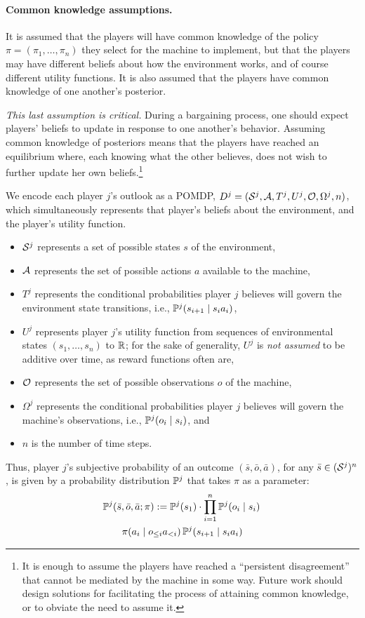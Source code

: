\documentclass{article}
\newcommand{\seq}{\bar}
\newcommand{\hist}[1]{o_{\le #1}a_{<#1}}
\begin{document}
\paragraph{Common knowledge assumptions.}  It is assumed that the players will have common knowledge of the policy $\pi = (\pi_1,\ldots,\pi_n)$ they select for the machine to implement, but that the players may have different beliefs about how the environment works, and of course different utility functions.  It is also assumed that the players have common knowledge of one another's posterior.  

\emph{This last assumption is critical.}  During a bargaining process, one should expect players' beliefs to update in response to one another's behavior.   Assuming common knowledge of posteriors means that the players have reached an equilibrium where, each knowing what the other believes, does not wish to further update her own beliefs.\footnote{It is enough to assume the players have reached a ``persistent disagreement'' that cannot be mediated by the machine in some way.  Future work should design solutions for facilitating the process of attaining common knowledge, or to obviate the need to assume it.}

We encode each player $j$'s outlook as a POMDP, $D^j = (\mathcal{S}^j,\mathcal{A},T^j, U^j, \mathcal{O}, \Omega^j, n)$, which simultaneously represents that player's beliefs about the environment, and the player's utility function.
\begin{itemize}
\item $\mathcal{S}^j$ represents a set of possible states $s$ of the environment,
\item $\mathcal{A}$ represents the set of possible actions $a$ available to the machine,
\item $T^j$ represents the conditional probabilities player $j$ believes will govern the environment state transitions, i.e., $\mathbb{P}^j(s_{i+1}\mid s_i a_i)$,
\item $U^j$ represents player $j$'s utility function from sequences of environmental states $(s_1,\ldots,s_n)$ to $\mathbb{R}$; for the sake of generality, $U^j$ is \emph{not assumed} to be additive over time, as reward functions often are, 
\item $\mathcal{O}$ represents the set of possible observations $o$ of the machine, 
\item $\Omega^j$ represents the conditional probabilities player $j$ believes will govern the machine's observations, i.e., $\mathbb{P}^j(o_i\mid s_i)$, and
\item $n$ is the number of time steps.
\end{itemize}
%
Thus, player $j$'s subjective probability of an outcome $(\seq s, \seq o, \seq a)$, for any $\seq s \in (\Ss^j)^n$, is given by a probability distribution $\mathbb{P}^j$ that takes $\pi$ as a parameter:
\begin{multline}
\label{eqn:pomdp}
\PP^j(\seq s, \seq o, \seq a ; \pi) := \PP^j(s_1) \cdot \prod_{i=1}^{n} 
\PP^j(o_i \mid s_i)\, \\  \pi(a_i \mid \hist i)\, \PP^j(s_{i+1} \mid s_ia_i)
\end{multline}
\end{document}
